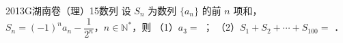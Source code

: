 
\begin{problem}{2013}{G}{湖南卷（理）}{15}{数列}
设 $ S_n $ 为数列 $ \{a_n\} $ 的前 $ n $ 项和，$ S_n=(-1)^n a_n-\dfrac{1}{2^n} $，$ n\in\mathbb{N}^* $，则  
（1）$ a_3= $ \underline{\hspace{4em}}；  
（2）$ S_1+S_2+\cdots+S_{100}= $ \underline{\hspace{4em}}．
\end{problem}

\begin{answer}

\end{answer}

\begin{solutions}

\end{solutions}